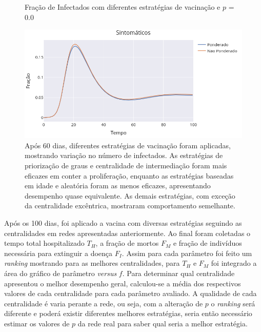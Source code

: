 \begin{figure}[H]
    \centering
    \captionsetup{font=normalsize,skip=0.8pt,singlelinecheck=on,labelsep=endash}
    \caption{Fração de Infectados com diferentes estratégias de vacinação e $p$ = 0.0}
    \includegraphics[scale= 0.5]{figuras/compara_ponderado_nponderado.png}
    \captionsetup{font=small,justification=justified}
    
    \caption*{ Após 60 dias, diferentes estratégias de vacinação foram aplicadas, mostrando variação no número de infectados. As estratégias de priorização de graus e centralidade de intermediação foram mais eficazes em conter a proliferação, enquanto as estratégias baseadas em idade e aleatória foram as menos eficazes, apresentando desempenho quase equivalente. As demais estratégias, com exceção da centralidade excêntrica, mostraram comportamento semelhante.}
    \label{fig:compara_ponderado_nponderado}
\end{figure}

Após os 100 dias, foi aplicado a vacina com diversas estratégias seguindo as centralidades em redes apresentadas anteriormente. Ao final foram coletadas o tempo total hospitalizado $T_H$, a fração de mortos $F_M$ e fração de indivíduos necessária para extinguir a doença $F_I$. Assim para cada parâmetro foi feito um \textit{ranking} mostrando para as melhores centralidades, para $T_H$ e $F_M$ foi integrado a área do gráfico de parâmetro \textit{versus} $f$. Para determinar qual centralidade apresentou o melhor desempenho geral, calculou-se a média dos respectivos valores de cada centralidade para cada parâmetro avaliado. A qualidade de cada centralidade é varia perante a rede, ou seja, com a alteração de $p$ o \textit{ranking} será diferente e poderá existir diferentes melhores estratégias, seria então necessário estimar os valores de $p$ da rede real para saber qual seria a melhor estratégia. 

